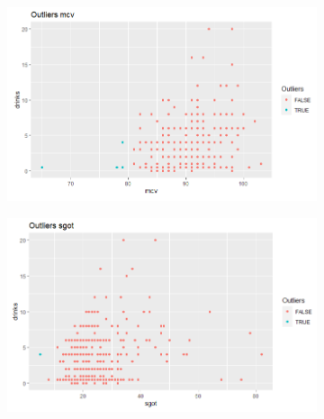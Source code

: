 \begin{figure}[!tbh]
	\centering
	\begin{subfigure}{0.5\textwidth}
	\includegraphics[width=1\linewidth]{figures/outlier_1}
\caption{}
\label{fig:outlier1}
	\end{subfigure}\hfil %
	\begin{subfigure}{0.5\textwidth}
	\includegraphics[width=1\linewidth]{figures/outlier_2}
\caption{}
\label{fig:outlier2}
	\end{subfigure}\hfil %
\end{figure}



